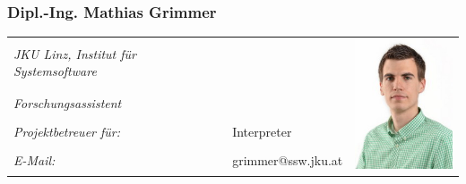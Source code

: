 \pagebreak

\subsubsection*{Dipl.-Ing. Mathias Grimmer}
\renewcommand{\arraystretch}{1.2}
\begin{tabularx}{1\textwidth}{@{} p{7cm} X l @{}}

\emph{JKU Linz, Institut für Systemsoftware}&&
\multirow{5}{2.5cm}{\includegraphics[width=3cm]{./media/images/project_team/Grimmer.png}
} 
\\
\emph{Forschungsassistent} && \\
\emph{Projektbetreuer für:} & Interpreter & \\
\emph{E-Mail:} & grimmer@ssw.jku.at & \\
\end{tabularx}